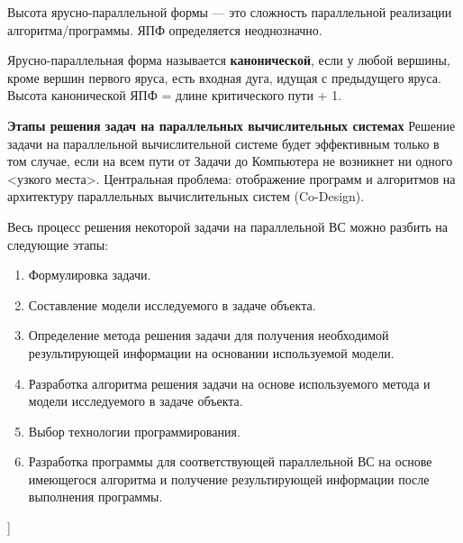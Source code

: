 Высота ярусно-параллельной формы --- это сложность параллельной реализации алгоритма/программы. 
ЯПФ определяется неоднозначно. 

Ярусно-параллельная форма называется \textbf{канонической}, если у любой вершины, кроме вершин первого яруса, есть входная дуга, идущая с предыдущего яруса. 
Высота канонической ЯПФ = длине критического пути + 1.

\textbf{Этапы решения задач на параллельных вычислительных системах}
Решение задачи на параллельной вычислительной системе будет эффективным только в том случае, если на всем пути от Задачи до Компьютера не возникнет ни одного <узкого места>.
Центральная проблема: отображение программ и алгоритмов на архитектуру параллельных вычислительных систем (Co-Design).

Весь процесс решения некоторой задачи на параллельной  ВС можно разбить на следующие этапы: 
\begin{enumerate}
    \item Формулировка задачи.
    \item Составление модели исследуемого в задаче объекта.
    \item Определение метода решения задачи для получения необходимой результирующей информации на основании используемой модели.
    \item Разработка алгоритма решения задачи на основе используемого метода и модели исследуемого в задаче объекта.
    \item Выбор технологии программирования.
    \item Разработка программы для соответствующей параллельной ВС на основе имеющегося алгоритма и получение результирующей информации после выполнения программы.
\end{enumerate}


\bigbreak
[\cite[page 69-96]{replace_me}]